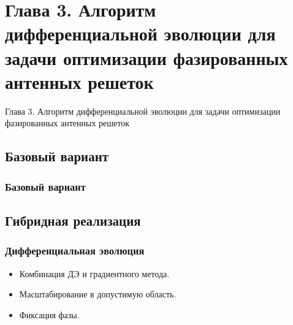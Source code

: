 \section{Глава 3. Алгоритм дифференциальной эволюции для задачи оптимизации фазированных антенных решеток}
\begin{frame}
    \begin{center}
        \Huge
        Глава 3. Алгоритм дифференциальной эволюции для задачи оптимизации фазированных антенных решеток
    \end{center}
\end{frame}
\begin{frame}
\subsection{Базовый вариант}
\frametitle{Базовый вариант}
\begin{figure}
\label{ris:ring}
\end{figure}
\end{frame}

\subsection{Гибридная реализация}
\begin{frame}
    \frametitle{Дифференциальная эволюция}
    \begin{itemize}
      \item Комбинация ДЭ и градиентного метода.
      \item Масштабирование в допустимую область.
      \item Фиксация фазы.
    \end{itemize}
\end{frame}

